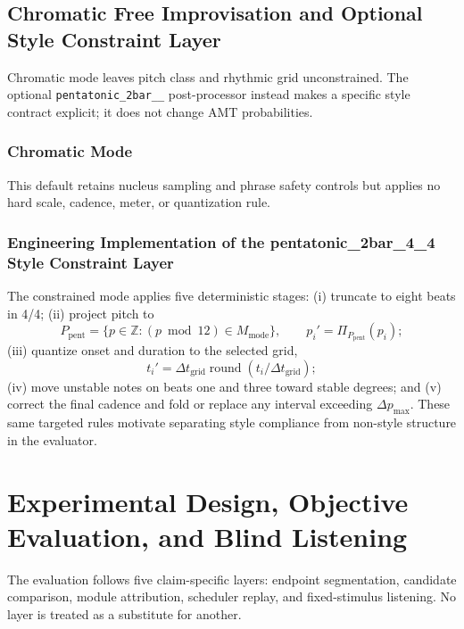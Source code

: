 \documentclass[11pt,a4paper]{article}
\begin{document}
\subsection{Chromatic Free Improvisation and Optional Style Constraint Layer}

Chromatic mode leaves pitch class and rhythmic grid unconstrained. The optional \texttt{pentatonic\_\allowbreak 2bar\_\_} post-processor instead makes a specific style contract explicit; it does not change AMT probabilities.

\subsubsection{Chromatic Mode}

This default retains nucleus sampling and phrase safety controls but applies no hard scale, cadence, meter, or quantization rule.

\subsubsection{Engineering Implementation of the pentatonic\_2bar\_4\_4 Style Constraint Layer}

The constrained mode applies five deterministic stages: (i) truncate to eight beats in 4/4; (ii) project pitch to
\begin{equation}
P_{\mathrm{pent}}=\{p\in\mathbb Z:(p\bmod 12)\in M_{\mathrm{mode}}\},
\qquad p_i'=\Pi_{P_{\mathrm{pent}}}(p_i);
\end{equation}
(iii) quantize onset and duration to the selected grid,
\begin{equation}
t_i'=\Delta t_{\mathrm{grid}}\operatorname{round}(t_i/\Delta t_{\mathrm{grid}});
\end{equation}
(iv) move unstable notes on beats one and three toward stable degrees; and (v) correct the final cadence and fold or replace any interval exceeding $\Delta p_{\max}$. These same targeted rules motivate separating style compliance from non-style structure in the evaluator.

\section{Experimental Design, Objective Evaluation, and Blind Listening}
\label{sec:call100-evaluation}

The evaluation follows five claim-specific layers: endpoint segmentation, candidate comparison, module attribution, scheduler replay, and fixed-stimulus listening. No layer is treated as a substitute for another.
\end{document}
